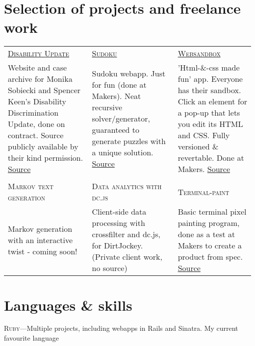 \documentclass[a4paper,10pt]{article}
\begin{document}
\section{Selection of projects and freelance work}
\begin{tabularx}{\linewidth}{XXX} 
  \textsc{\href{http://disability-discrimination.herokuapp.com/}{Disability Update}} & \textsc{\href{http://sudoku.simonwoolf.net/}{Sudoku}} & \textsc{\href{http://websandbox.herokuapp.com/}{Websandbox}} \\

  Website and case archive for Monika Sobiecki and Spencer Keen's Disability
  Discrimination Update, done on contract. Source publicly available by their
  kind permission. \href{https://github.com/SimonWoolf/disability-discrimination-update}{Source} &

  Sudoku webapp. Just for fun (done at Makers). Neat recursive solver/generator, guaranteed 
  to generate puzzles with a unique solution. \href{https://github.com/SimonWoolf/sudoku}{Source} &

  'Html-\&-css made fun' app. Everyone has their sandbox. Click an element for
  a pop-up that lets you edit its HTML and CSS. Fully versioned \& revertable. 
  Done at Makers. \href{https://github.com/SimonWoolf/websandbox}{Source} \\

  & & \\

  \textsc{Markov text generation} & \textsc{Data analytics with dc.js} &
  \textsc{Terminal-paint} \\

  Markov generation with an interactive twist - coming soon! &

  Client-side data processing with crossfilter and dc.js, for DirtJockey. 
  (Private client work, no source) &

  Basic terminal pixel painting program, done as a test at Makers to create a
  product from spec. \href{https://github.com/SimonWoolf/test6}{Source} \\
\end{tabularx}

\section{Languages \& skills}

\textsc{Ruby}---Multiple projects, including webapps in Rails and Sinatra. My current favourite language
\end{document}
